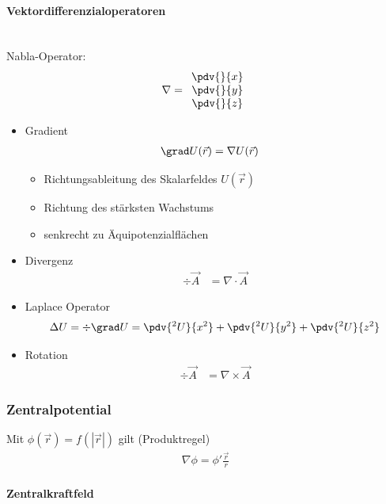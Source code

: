 \paragraph{Vektordifferenzialoperatoren} \ \\
Nabla-Operator:
\begin{align*}
	\nabla=\begin{array}{c}
		\pdv{}{x}\\\pdv{}{y}\\\pdv{}{z}
	\end{array}
\end{align*}
\begin{itemize}
	\item Gradient
	\begin{align*}
		\grad U(\vec{r})&=\nabla U(\vec{r})
	\end{align*}
	\begin{itemize}
		\item Richtungsableitung des Skalarfeldes $U(\vec{r})$
		\item Richtung des stärksten Wachstums
		\item senkrecht zu Äquipotenzialflächen
	\end{itemize}
	\item Divergenz
	\begin{align*}
		\div \vec{A}&=\nabla \cdot \vec{A}
	\end{align*}
	\item Laplace Operator
	\begin{align*}
		\Delta U = \div \grad U = \pdv{^2U}{x^2}+\pdv{^2U}{y^2}+\pdv{^2U}{z^2}
	\end{align*}
	\item Rotation
	\begin{align*}
		\div \vec{A}&=\nabla \times \vec{A}
	\end{align*}
\end{itemize}

\subsubsection{Zentralpotential}
Mit $\phi(\vec{r})=f(|\vec{r}|)$ gilt (Produktregel)
\begin{align*}
	\nabla \phi = \phi'\frac{\vec{r}}{r}
\end{align*}
\paragraph{Zentralkraftfeld}






